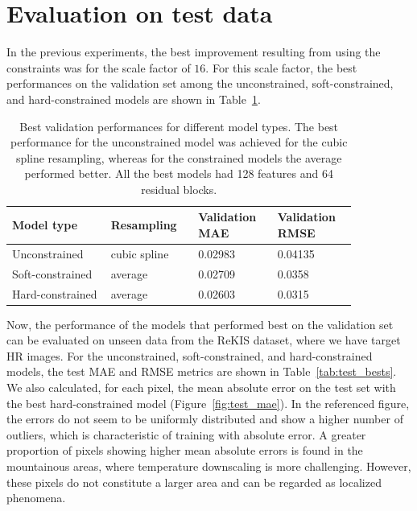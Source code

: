 \section{Evaluation on test data}
\label{s:test_eval}

In the previous experiments, the best improvement resulting from using the constraints was for the scale factor of $16$.
For this scale factor, the best performances on the validation set among the unconstrained, soft-constrained, and hard-constrained models are shown in Table~\ref{tab:val_bests}.

\begin{table}[h!]
    \centering
    \begin{tabular}{|m{0.25\linewidth}|m{0.2\linewidth}|m{0.2\linewidth}|m{0.2\linewidth}|}
        \hline
         \textbf{Model type} & \textbf{Resampling} & \textbf{Validation} \textbf{MAE} & \textbf{Validation} \textbf{RMSE} \\
         \hline \hline
         Unconstrained & cubic spline & 0.02983 & 0.04135 \\
         \hline
         Soft-constrained & average & 0.02709 & 0.0358 \\
         \hline
         Hard-constrained & average & 0.02603 & 0.0315 \\
         \hline
    \end{tabular}
    \caption[Best validation performances for different model types]{
    Best validation performances for different model types. 
    The best performance for the unconstrained model was achieved for the cubic spline resampling, whereas for the constrained models the average performed better. 
    All the best models had 128 features and 64 residual blocks.}
    \label{tab:val_bests}
\end{table}
\newpage
Now, the performance of the models that performed best on the validation set can be evaluated on unseen data from the ReKIS dataset, where we have target HR images.
For the unconstrained, soft-constrained, and hard-constrained models, the test MAE and RMSE metrics are shown in Table~\ref{tab:test_bests}.
We also calculated, for each pixel, the mean absolute error on the test set with the best hard-constrained model (Figure~\ref{fig:test_mae}).
In the referenced figure, the errors do not seem to be uniformly distributed and show a higher number of outliers, which is characteristic of training with absolute error.
A greater proportion of pixels showing higher mean absolute errors is found in the mountainous areas, where temperature downscaling is more challenging.
However, these pixels do not constitute a larger area and can be regarded as localized phenomena.

